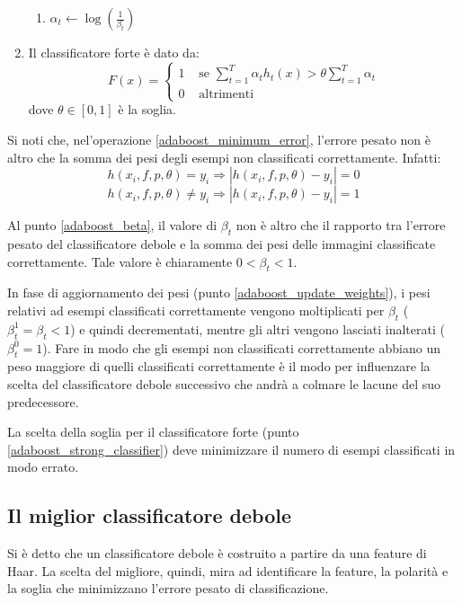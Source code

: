 \begin{enumerate}
\begin{enumerate}
        \item $\alpha_t \leftarrow \log(\frac{1}{\beta_t})$
    \end{enumerate}

    \item \label{adaboost_strong_classifier} Il classificatore forte è dato da:
    \begin{equation}
        F(x) = \begin{cases}
        1 & \text{ se } \sum_{t = 1}^{T} \alpha_t h_t(x) > \theta \sum_{t = 1}^{T} \alpha_t \\
        0 & \text{ altrimenti }
    \end{cases}
\end{equation}
dove $\theta \in [0,1]$ è la soglia.
\end{enumerate}

Si noti che, nel'operazione \ref{adaboost_minimum_error}, l'errore pesato non è altro che la somma dei pesi degli esempi non classificati correttamente. Infatti:
$$ h(x_i, f, p, \theta) = y_i \Rightarrow |h(x_i, f, p, \theta) - y_i| = 0 $$
$$ h(x_i, f, p, \theta) \neq y_i \Rightarrow |h(x_i, f, p, \theta) - y_i| = 1 $$

Al punto \ref{adaboost_beta}, il valore di $\beta_t$ non è altro che il rapporto tra l'errore pesato del classificatore debole e la somma dei pesi delle immagini classificate correttamente. Tale valore è chiaramente $0 < \beta_t < 1$.

In fase di aggiornamento dei pesi (punto \ref{adaboost_update_weights}), i pesi relativi ad esempi classificati correttamente vengono moltiplicati per $\beta_t$ ($\beta_{t}^{1} = \beta_t < 1$) e quindi decrementati, mentre gli altri vengono lasciati inalterati ($\beta_{t}^{0} = 1$). Fare in modo che gli esempi non classificati correttamente abbiano un peso maggiore di quelli classificati correttamente è il modo per influenzare la scelta del classificatore debole successivo che andrà a colmare le lacune del suo predecessore.

La scelta della soglia per il classificatore forte (punto \ref{adaboost_strong_classifier}) deve minimizzare il numero di esempi classificati in modo errato.


\subsection{Il miglior classificatore debole} %
\label{sub:il_miglior_classificatore_debole}
Si è detto che un classificatore debole è costruito a partire da una feature di Haar. La scelta del migliore, quindi, mira ad identificare la feature, la polarità e la soglia che minimizzano l'errore pesato di classificazione.

